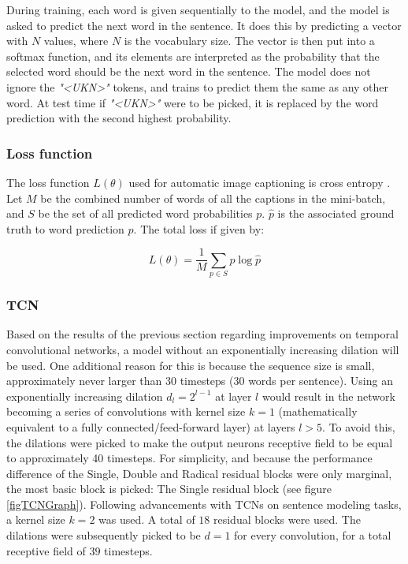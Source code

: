 \documentclass[a4paper, twoside]{article}
\begin{document}
During training, each word is given sequentially to the model, and the model is asked to predict the next word in the sentence. It does this by predicting a vector with $N$ values, where $N$ is the vocabulary size. The vector is then put into a softmax function, and its elements are interpreted as the probability that the selected word should be the next word in the sentence. The model does not ignore the \textit{"<UKN>"} tokens, and trains to predict them the same as any other word. At test time if \textit{"<UKN>"} were to be picked, it is replaced by the word prediction with the second highest probability.

\subsubsection{Loss function}
The loss function $L(\theta)$ used for automatic image captioning is cross entropy \cite{notesonbackprop}. Let $M$ be the combined number of words of all the captions in the mini-batch, and $S$ be the set of all predicted word probabilities $p$. $\hat{p}$ is the associated ground truth to word prediction $p$. The total loss if given by:

\begin{equation}
L(\theta) = \frac{1}{M} \sum_{p \in S} p \log{\hat{p}}
\end{equation}

\subsubsection{TCN}
Based on the results of the previous section regarding improvements on temporal convolutional networks, a model without an exponentially increasing dilation will be used. One additional reason for this is because the sequence size is small, approximately never larger than 30 timesteps (30 words per sentence). Using an exponentially increasing dilation $d_l = 2^{l-1}$ at layer $l$ would result in the network becoming a series of convolutions with kernel size $k=1$ (mathematically equivalent to a fully connected/feed-forward layer) at layers $l>5$. To avoid this, the dilations were picked to make the output neurons receptive field to be equal to approximately 40 timesteps. For simplicity, and because the performance difference of the Single, Double and Radical residual blocks were only marginal, the most basic block is picked: The Single residual block (see figure \ref{figTCNGraph}). 
Following \cite{tcn} advancements with TCNs on sentence modeling tasks, a kernel size $k=2$ was used. A total of $18$ residual blocks were used. The dilations were subsequently picked to be $d=1$ for every convolution, for a total receptive field of $39$ timesteps.
\end{document}
